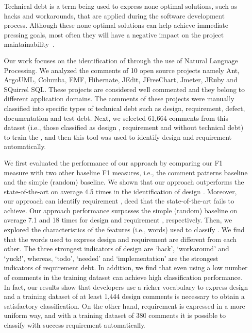 Technical debt is a term being used to express none optimal solutions, such as hacks and workarounds, that are applied during the software development process. Although these none optimal solutions can help achieve immediate pressing goals, most often they will have a negative impact on the project maintainability~\cite{Zazworka2011MTD}. 

Our work focuses on the identification of \SATD through the use of Natural Language Processing. We analyzed the comments of 10 open source projects namely Ant, ArgoUML, Columba, EMF, Hibernate, JEdit, JFreeChart, Jmeter, JRuby and SQuirrel SQL. These projects are considered well commented and they belong to different application domains. The comments of these projects were manually classified into specific types of technical debt such as design, requirement, defect, documentation and test debt. Next, we selected 61,664 comments from this dataset (i.e., those classified as design \SATD, requirement \SATD and without technical debt) to train the , and then this tool was used to identify  design and requirement \SATD automatically.

We first evaluated the performance of our approach by comparing our F1 measure with two other baseline F1 measures, i.e., the comment patterns baseline and the simple (random) baseline. We shown that our approach outperforms the state-of-the-art on average 4.5 times in the identification of design \SATD. Moreover, our approach can identify requirement \SATD, deed that the state-of-the-art fails to achieve. Our approach performance surpasses the simple (random) baseline on average 7.1 and 18 times for design and requirement \SATD, respectively. Then, we explored the characteristics of the features (i.e., words) used to classify \SATD. We find that the words used to express design and requirement \SATD are different from each other. The three strongest indicators of design \SATD are `hack', `workaround' and `yuck!', whereas, `todo', `needed' and `implementation' are the strongest indicators of requirement debt. In addition, we find that even using a low number of \SATD comments in the training dataset can achieve high classification performance. In fact, our results show that developers use a richer vocabulary to express design \SATD and a training dataset of at least 1,444 design \SATD comments is necessary to obtain a satisfactory classification. On the other hand, requirement \SATD is expressed in a more uniform way, and with a training dataset of 380 \SATD comments it is possible to classify with success requirement \SATD automatically.

